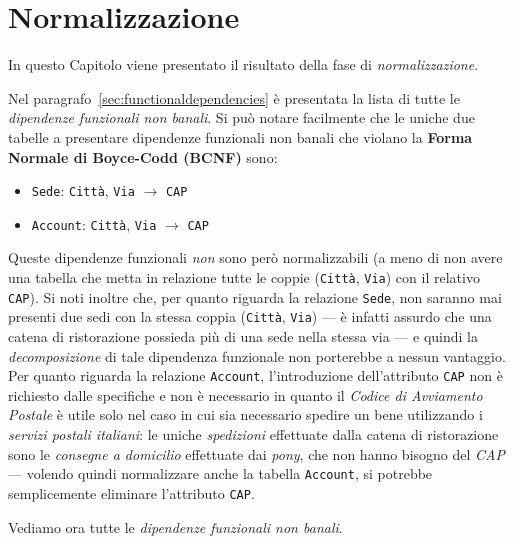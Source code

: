 \chapter{Normalizzazione}
In questo Capitolo viene presentato il risultato della fase di {\it normalizzazione}.

Nel paragrafo~\vref{sec:functionaldependencies} è presentata la lista di tutte le {\it dipendenze
funzionali non banali}. Si può notare facilmente che le uniche due tabelle a presentare
dipendenze funzionali non banali che violano la {\bf Forma Normale di Boyce-Codd (BCNF)}
sono:
\begin{itemize}
\item {\tt Sede}: {\tt Città}, {\tt Via} $\rightarrow$ {\tt CAP}
\item {\tt Account}: {\tt Città}, {\tt Via} $\rightarrow$ {\tt CAP}
\end{itemize}
Queste dipendenze funzionali {\it non} sono però normalizzabili (a meno di non avere una tabella
che metta in relazione tutte le coppie ({\tt Città}, {\tt Via}) con il relativo {\tt CAP}). Si
noti inoltre che, per quanto riguarda la relazione {\tt Sede}, non saranno mai presenti
due sedi con la stessa coppia ({\tt Città}, {\tt Via}) --- è infatti assurdo che una catena
di ristorazione possieda più di una sede nella stessa via --- e quindi la {\it decomposizione}
di tale dipendenza funzionale non porterebbe a nessun vantaggio. Per quanto riguarda la
relazione {\tt Account}, l'introduzione dell'attributo {\tt CAP} non è richiesto dalle
specifiche e non è necessario in quanto il {\it Codice di Avviamento Postale} è utile solo
nel caso in cui sia necessario spedire un bene utilizzando i {\it servizi postali italiani}: le
uniche {\it spedizioni} effettuate dalla catena di ristorazione sono le {\it consegne a
domicilio} effettuate dai {\it pony}, che non hanno bisogno del {\it CAP} --- volendo quindi
normalizzare anche la tabella {\tt Account}, si potrebbe semplicemente eliminare l'attributo {\tt CAP}.

Vediamo ora tutte le {\it dipendenze funzionali non banali}.

